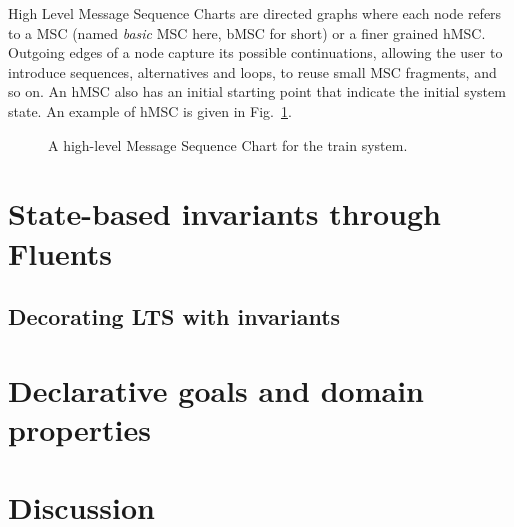 High Level Message Sequence Charts are directed graphs where each node refers to a MSC (named \emph{basic} MSC here, bMSC for short) or a finer grained hMSC. Outgoing edges of a node capture its possible continuations, allowing the user to introduce sequences, alternatives and loops, to reuse small MSC fragments, and so on. An hMSC also has an initial starting point that indicate the initial system state. An example of hMSC is given in Fig.~\ref{image:train-hmsc}.

\vspace{0.4cm}
\begin{figure}[H]\centering
{}
\caption{A high-level Message Sequence Chart for the train system.\label{image:train-hmsc}}
\end{figure}

\section{State-based invariants through Fluents}

\subsection{Decorating LTS with invariants}

\section{Declarative goals and domain properties}

\section{Discussion\label{section:background-discussion}}
